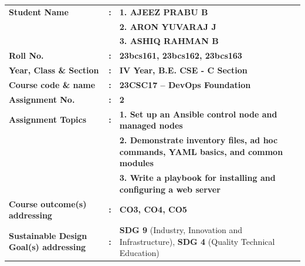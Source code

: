 \documentclass[11pt,a4paper]{article}
\begin{document}
\begin{titlepage}
    \thispagestyle{empty}
    
    \vspace*{0.2cm}
    \large
    \renewcommand{\arraystretch}{1.35}
    \begin{tabular}{p{5.2cm}cp{9.5cm}}
        \textbf{Student Name} & \textbf{:} & 
        \textbf{1. AJEEZ PRABU B} \\
        & & \textbf{2. ARON YUVARAJ J} \\
        & & \textbf{3. ASHIQ RAHMAN B} \\[0.3cm]
        
        \textbf{Roll No.} & \textbf{:} & 
        \textbf{23bcs161, 23bcs162, 23bcs163} \\[0.3cm]
        
        \textbf{Year, Class \& Section} & \textbf{:} & 
        \textbf{IV Year, B.E. CSE - C Section} \\[0.3cm]
        
        \textbf{Course code \& name} & \textbf{:} & 
        \textbf{23CSC17 -- DevOps Foundation} \\[0.3cm]
        
        \textbf{Assignment No.} & \textbf{:} & 
        \textbf{2} \\[0.3cm]
        
        \textbf{Assignment Topics} & \textbf{:} & 
        \textbf{1. Set up an Ansible control node and managed nodes} \\
        & & \textbf{2. Demonstrate inventory files, ad hoc commands, YAML basics, and common modules} \\
        & & \textbf{3. Write a playbook for installing and configuring a web server} \\[0.3cm]
        
        \textbf{Course outcome(s) addressing} & \textbf{:} & 
        \textbf{CO3, CO4, CO5} \\[0.3cm]
        
        \textbf{Sustainable Design Goal(s) addressing} & \textbf{:} & 
        \textbf{SDG 9} (Industry, Innovation and Infrastructure), \textbf{SDG 4} (Quality Technical Education) \\
    \end{tabular}
    

\end{titlepage}
\end{document}
